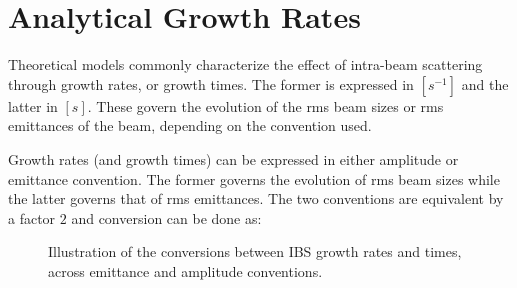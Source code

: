 \section{Analytical Growth Rates}
\label{section:ibs_growth_rates}

Theoretical models commonly characterize the effect of intra-beam scattering through growth rates, or growth times.
The former is expressed in \(\left[s^{-1}\right]\) and the latter in \(\left[s\right]\).
These govern the evolution of the rms beam sizes or rms emittances of the beam, depending on the convention used.
\newline

Growth rates (and growth times) can be expressed in either amplitude or emittance convention.
The former governs the evolution of rms beam sizes while the latter governs that of rms emittances.
The two conventions are equivalent by a factor \(2\) and conversion can be done as:

\begin{figure}[!htb]
    \centering
    \caption{Illustration of the conversions between IBS growth rates and times, across emittance and amplitude conventions.}
    \label{figure:ibs_convention_conversion}
\end{figure}

